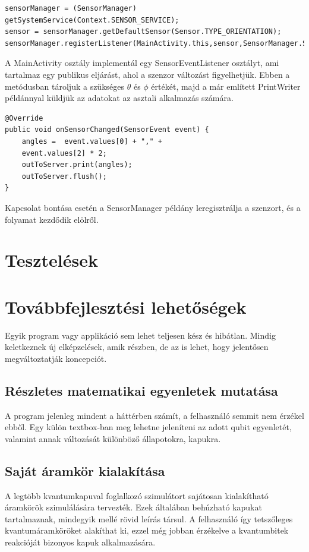 \documentclass[
]{thesis-ekf}
\theoremstyle{definition}
\theoremstyle{remark}
\begin{document}
\begin{lstlisting}[caption={Szenzor létrehozása és regisztrálása}]
sensorManager = (SensorManager) getSystemService(Context.SENSOR_SERVICE);
sensor = sensorManager.getDefaultSensor(Sensor.TYPE_ORIENTATION);
sensorManager.registerListener(MainActivity.this,sensor,SensorManager.SENSOR_DELAY_NORMAL);
\end{lstlisting}

A MainActivity osztály implementál egy SensorEventListener osztályt, ami tartalmaz egy publikus eljárást, ahol a szenzor változást figyelhetjük. Ebben a metódusban tároljuk a szükséges $\theta$ és $\phi$ értékét, majd a már említett PrintWriter példánnyal küldjük az adatokat az asztali alkalmazás számára.

\begin{lstlisting}[caption={Szenzor adatok gyűjtése és küldése az asztali alkalmazás számára}]
@Override
public void onSensorChanged(SensorEvent event) {
	angles =  event.values[0] + "," +
	event.values[2] * 2;
	outToServer.print(angles);
	outToServer.flush();
}
\end{lstlisting}

Kapcsolat bontása esetén a SensorManager példány leregisztrálja a szenzort, és a folyamat kezdődik elölről.

\section{Tesztelések}

\section{Továbbfejlesztési lehetőségek}
Egyik program vagy applikáció sem lehet teljesen kész és hibátlan. Mindig keletkeznek új elképzelések, amik részben, de az is lehet, hogy jelentősen megváltoztatják koncepciót.
\subsection{Részletes matematikai egyenletek mutatása}
A program jelenleg mindent a háttérben számít, a felhasználó semmit nem érzékel ebből. Egy külön textbox-ban meg lehetne jeleníteni az adott qubit egyenletét, valamint annak változását különböző állapotokra, kapukra.

\subsection{Saját áramkör kialakítása}
A legtöbb kvantumkapuval foglalkozó szimulátort sajátosan kialakítható áramkörök szimulálására tervezték. Ezek általában behúzható kapukat tartalmaznak, mindegyik mellé rövid leírás társul. A felhasználó így tetszőleges kvantumáramköröket alakíthat ki, ezzel még jobban érzékelve a kvantumbitek reakcióját bizonyos kapuk alkalmazására.
\end{document}
